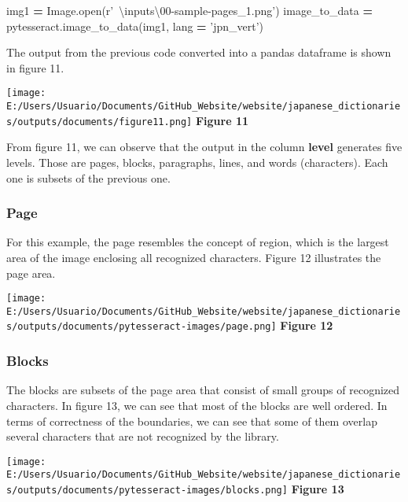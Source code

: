 \documentclass[
]{article}
\newenvironment{Shaded}{\begin{snugshade}}{\end{snugshade}}
\newcommand{\BuiltInTok}[1]{#1}
\newcommand{\NormalTok}[1]{#1}
\newcommand{\OperatorTok}[1]{\textcolor[rgb]{0.81,0.36,0.00}{\textbf{#1}}}
\newcommand{\StringTok}[1]{\textcolor[rgb]{0.31,0.60,0.02}{#1}}
\newcommand{\VerbatimStringTok}[1]{\textcolor[rgb]{0.31,0.60,0.02}{#1}}
\begin{document}
\begin{Shaded}
\begin{Highlighting}[]
\NormalTok{img1 }\OperatorTok{=}\NormalTok{ Image.}\BuiltInTok{open}\NormalTok{(}\VerbatimStringTok{r'~\textbackslash{}inputs\textbackslash{}00-sample-pages_1.png'}\NormalTok{)}
\NormalTok{image_to_data }\OperatorTok{=}\NormalTok{ pytesseract.image_to_data(img1, lang }\OperatorTok{=} \StringTok{'jpn_vert'}\NormalTok{)}
\end{Highlighting}
\end{Shaded}

The output from the previous code converted into a pandas dataframe is
shown in figure 11.

\texttt{[image: E:/Users/Usuario/Documents/GitHub\_Website/website/japanese\_dictionaries/outputs/documents/figure11.png]}
\textbf{Figure 11}

From figure 11, we can observe that the output in the column
\textbf{level} generates five levels. Those are pages, blocks,
paragraphs, lines, and words (characters). Each one is subsets of the
previous one.

\hypertarget{page}{%
\subsubsection{Page}\label{page}}

For this example, the page resembles the concept of region, which is the
largest area of the image enclosing all recognized characters. Figure 12
illustrates the page area.

\texttt{[image: E:/Users/Usuario/Documents/GitHub\_Website/website/japanese\_dictionaries/outputs/documents/pytesseract-images/page.png]}
\textbf{Figure 12}

\hypertarget{blocks}{%
\subsubsection{Blocks}\label{blocks}}

The blocks are subsets of the page area that consist of small groups of
recognized characters. In figure 13, we can see that most of the blocks
are well ordered. In terms of correctness of the boundaries, we can see
that some of them overlap several characters that are not recognized by
the library.

\texttt{[image: E:/Users/Usuario/Documents/GitHub\_Website/website/japanese\_dictionaries/outputs/documents/pytesseract-images/blocks.png]}
\textbf{Figure 13}
\end{document}
